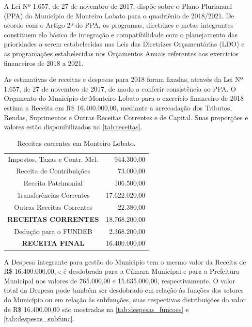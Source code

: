 A Lei Nº 1.657, de 27 de novembro de 2017, dispõe sobre o Plano Plurianual (PPA) do Município de Monteiro Lobato para o quadriênio de 2018/2021. De acordo com o Artigo 2º do PPA, os programas, diretrizes e metas integrantes constituem elo básico de integração e compatibilidade com o planejamento das prioridades a serem estabelecidas nas Leis das Diretrizes Orçamentárias (LDO) e as programações estabelecidas nos Orçamentos Anuais referentes aos exercícios financeiros de 2018 a 2021.

As estimativas de receitas e despesas para 2018 foram fixadas, através da Lei Nº 1.657, de 27 de novembro de 2017, de modo a conferir consistência ao PPA. O Orçamento do Município de Monteiro Lobato para o exercício financeiro de 2018 estima a Receita em R\$ 16.400.000,00, mediante a arrecadação dos Tributos, Rendas, Suprimentos e Outras Receitas Correntes e de Capital. Suas proporções e valores estão disponibilizados na \autoref{tab:receitas}. 

\begin{table}[htbp]
	\centering
	\caption{Receitas correntes em Monteiro Lobato.}
	\begin{tabular}{c|r}
		\rowcolor[rgb]{ .984,  .831,  .706} Impostos, Taxas e Contr. Mel. & 944.300,00 \\
		\rowcolor[rgb]{ .992,  .914,  .851} Receita de Contribuições & 73.000,00 \\
		\rowcolor[rgb]{ .984,  .831,  .706} Receita Patrimonial & 106.500,00 \\
		\rowcolor[rgb]{ .992,  .914,  .851} Transferências Correntes & 17.622.020,00 \\
		\rowcolor[rgb]{ .984,  .831,  .706} Outras Receitas Correntes & 22.380,00 \\
		\rowcolor[rgb]{ .992,  .914,  .851} \textbf{RECEITAS CORRENTES} & 18.768.200,00 \\
		\rowcolor[rgb]{ .984,  .831,  .706} Dedução para o FUNDEB & 2.368.200,00 \\
		\rowcolor[rgb]{ .992,  .914,  .851} \textbf{RECEITA FINAL} & 16.400.000,00 \\
	\end{tabular}%
	\label{tab:receitas}%
\end{table}%


A Despesa integrante para gestão do Município tem o mesmo valor da Receita de R\$ 16.400.000,00, e é desdobrada para a Câmara Municipal e para a Prefeitura Municipal nos valores de 765.000,00 e 15.635.000,00, respectivamente. O valor total da Despesa pode também ser desdobrado em relação às funções dos setores do Município ou em relação às subfunções, suas respectivas distribuições do valor de R\$ 16.400.00,00 são mostradas na \autoref{tab:despesas_funcoes} e \autoref{tab:despesas_subfunc}.

